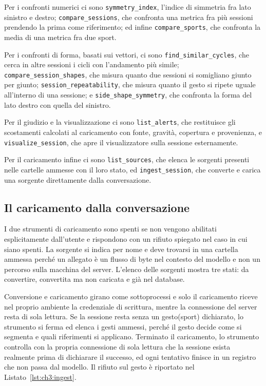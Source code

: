 Per i confronti numerici ci sono \texttt{symmetry\_index}, l'indice di simmetria
fra lato sinistro e destro; \texttt{compare\_sessions}, che confronta una metrica
fra più sessioni prendendo la prima come riferimento; ed infine
\texttt{compare\_sports}, che confronta la
media di una metrica fra due sport.

Per i confronti di forma, basati sui vettori, ci sono
\texttt{find\_similar\_cycles}, che cerca in altre sessioni i cicli con
l'andamento più simile; \texttt{compare\_session\_shapes}, che misura quanto due
sessioni si somigliano giunto per giunto; \texttt{session\_repeatability}, che
misura quanto il gesto si ripete uguale all'interno di una sessione; e
\texttt{side\_shape\_symmetry}, che confronta la forma del lato destro con quella
del sinistro.

Per il giudizio e la visualizzazione ci sono \texttt{list\_alerts}, che
restituisce gli scostamenti calcolati al caricamento con fonte, gravità,
copertura e provenienza, e \texttt{visualize\_session}, che apre il
visualizzatore sulla sessione esternamente.

Per il caricamento infine ci sono \texttt{list\_sources}, che elenca le sorgenti
presenti nelle cartelle ammesse con il loro stato, ed \texttt{ingest\_session},
che converte e carica una sorgente direttamente dalla conversazione.

\subsection{Il caricamento dalla conversazione}
\label{subsec:ch3:ingest}

I due strumenti di caricamento sono spenti se non vengono abilitati
esplicitamente dall'utente e rispondono con un rifiuto spiegato nel caso in cui siano spenti. 
La sorgente si indica per nome e deve trovarsi in una cartella ammessa perché un allegato è un
flusso di byte nel contesto del modello e non un percorso sulla macchina del
server. L'elenco delle sorgenti mostra tre stati: da convertire, convertita
ma non caricata e già nel database.

Conversione e caricamento girano come sottoprocessi e solo il caricamento riceve
nel proprio ambiente la credenziale di scrittura, mentre la connessione del server
resta di sola lettura. Se la sessione resta senza un gesto(sport) dichiarato, lo
strumento si ferma ed elenca i gesti ammessi, perché il gesto decide come si
segmenta e quali riferimenti si applicano. Terminato il caricamento, lo strumento
controlla con la propria connessione di sola lettura che la sessione esista
realmente prima di dichiarare il successo, ed ogni tentativo finisce in un
registro che non passa dal modello. Il rifiuto sul gesto è riportato nel
Listato~\ref{lst:ch3:ingest}.

